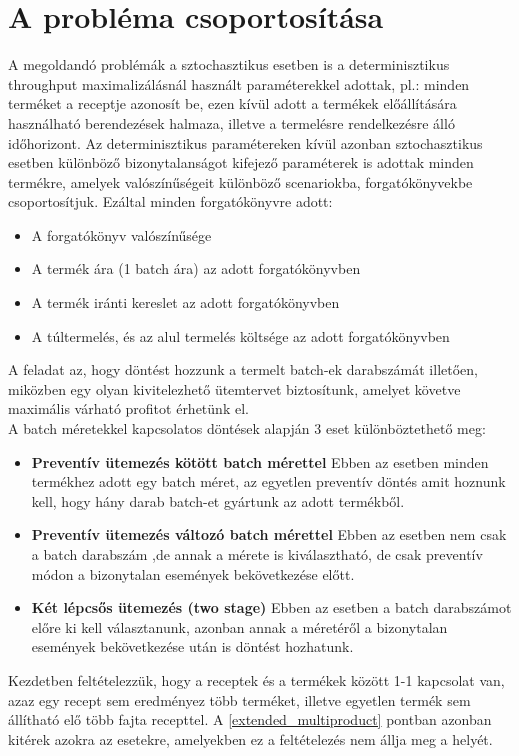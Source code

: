 \section{A probléma csoportosítása} \label{problem_csop}
A megoldandó problémák a sztochasztikus esetben is a determinisztikus throughput maximalizálásnál használt paraméterekkel adottak, pl.: minden terméket a receptje azonosít be, ezen kívül adott a termékek előállítására használható berendezések halmaza, illetve a termelésre rendelkezésre álló időhorizont.
Az determinisztikus paramétereken kívül azonban sztochasztikus esetben különböző bizonytalanságot kifejező paraméterek is adottak minden termékre, amelyek valószínűségeit különböző scenariokba, forgatókönyvekbe csoportosítjuk.
Ezáltal minden forgatókönyvre adott: 
\begin{itemize}
\item{A forgatókönyv valószínűsége}
\item{A termék ára (1 batch ára) az adott forgatókönyvben}
\item{A termék iránti kereslet az adott forgatókönyvben}
\item{A túltermelés, és az alul termelés költsége az adott forgatókönyvben}
\end{itemize}
A feladat az, hogy döntést hozzunk a termelt batch-ek darabszámát illetően, miközben egy olyan kivitelezhető ütemtervet biztosítunk, amelyet követve maximális várható profitot érhetünk el.\\
A batch méretekkel kapcsolatos döntések alapján 3 eset különböztethető meg:
\begin{itemize}
\item \textbf{Preventív ütemezés kötött batch mérettel} Ebben az esetben minden termékhez adott egy batch méret, az egyetlen preventív döntés amit hoznunk kell, hogy hány darab batch-et gyártunk az adott termékből.
\item \textbf{Preventív ütemezés változó batch mérettel} Ebben az esetben nem csak a batch darabszám ,de annak a mérete is kiválasztható, de csak preventív módon a bizonytalan események bekövetkezése előtt.
\item \textbf{Két lépcsős ütemezés (two stage)} Ebben az esetben a batch darabszámot előre ki kell választanunk, azonban annak a méretéről a bizonytalan események bekövetkezése után is döntést hozhatunk.
\end{itemize}
Kezdetben feltételezzük, hogy a receptek és a termékek között 1-1 kapcsolat van, azaz egy recept sem eredményez több terméket, illetve egyetlen termék sem állítható elő több fajta recepttel.
A \ref{extended_multiproduct} pontban azonban kitérek azokra az esetekre, amelyekben ez a feltételezés nem állja meg a helyét.
